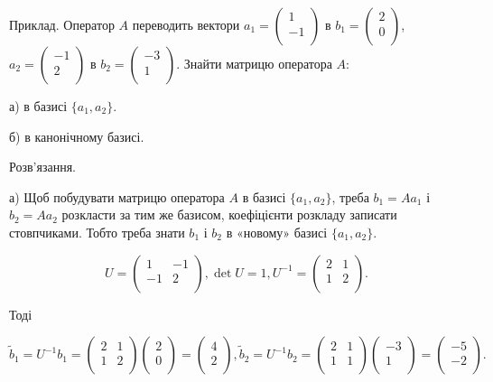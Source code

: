 Приклад. Оператор $A$ переводить вектори $a_1 = \begin{pmatrix} 1 \\ -1 \\ \end{pmatrix}$ в 
$b_1 = \begin{pmatrix} 2 \\ 0 \\ \end{pmatrix}$, $a_2 = \begin{pmatrix} -1 \\ 2 \\ \end{pmatrix}$
в $b_2 = \begin{pmatrix} -3 \\ 1 \\ \end{pmatrix}$. Знайти матрицю оператора $A$:

а) в базисі $\{a_1, a_2\}$.

б) в канонічному базисі.

Розв’язання.

а) Щоб побудувати матрицю оператора $A$ в базисі $\{a_1, a_2\}$, треба $b_1 = A a_1$ і
$b_2 = A a_2$ розкласти за тим же базисом, коефіцієнти розкладу записати
стовпчиками. Тобто треба знати $b_1$ і $b_2$ в «новому» базисі $\{a_1, a_2\}$.

$$U = \begin{pmatrix}
	1 & -1 \\
	-1 & 2 \\
\end{pmatrix}, \det U = 1, U^{-1} = \begin{pmatrix}
	2 & 1 \\
	1 & 2 \\
\end{pmatrix}.$$

Тоді 

$$\tilde{b}_1 = U^{-1} b_1 = \begin{pmatrix}
	2 & 1 \\
	1 & 2 \\
\end{pmatrix} \begin{pmatrix}
	2 \\
	0 \\
\end{pmatrix} = \begin{pmatrix}
	4 \\
	2 \\
\end{pmatrix}, \tilde{b}_2 = U^{-1} b_2 = \begin{pmatrix}
	2 & 1 \\
	1 & 1 \\
\end{pmatrix} \begin{pmatrix}
	-3 \\
	1 \\
\end{pmatrix} = \begin{pmatrix}
	-5 \\
	-2 \\
\end{pmatrix}.$$


